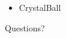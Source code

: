 \documentclass{beamer}
\begin{document}
\begin{frame}
    \begin{itemize}
        \item CrystalBall
    \end{itemize}
\end{frame}


\begin{frame}{}
    \begin{center}
        \Large
        Questions?
    \end{center}
\end{frame}



\end{document}
